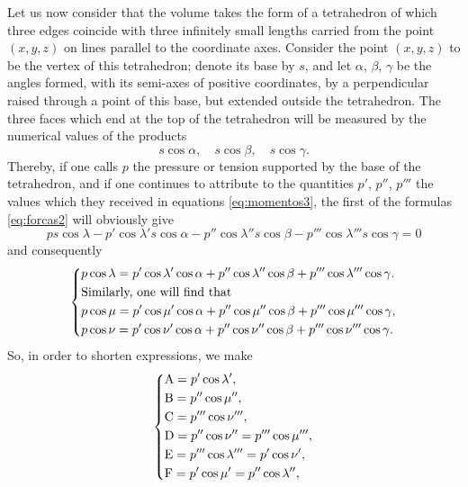 \documentclass[leqno,openright,smallroyalvopaper,8pt,twoside,showtrims]{memoir}
\begin{document}
Let us now consider that the volume takes the form of a tetrahedron of which three edges coincide with three infinitely small lengths carried from the point $(x, y, z)$ on lines parallel to the coordinate axes. Consider the point $(x, y, z)$ to be the vertex of this tetrahedron; denote its base by $s$, and let $\alpha$, $\beta$, $\gamma$ be the angles formed, with its semi-axes of positive coordinates, by a perpendicular raised through a point of this base, but extended outside the tetrahedron. The three faces which end at the top of the tetrahedron will be measured by the numerical values of the products
\begin{equation}
s\cos\alpha,\quad s\cos\beta,\quad s\cos\gamma.
\end{equation}
Thereby, if one calls $p$ the pressure or tension supported by the base of the tetrahedron, and if one continues to attribute to the quantities $p'$, $p''$, $p'''$ the values which they received in equations \eqref{eq:momentos3}, the first of the formulas \eqref{eq:forcas2} will obviously give
\begin{equation*}
ps\cos\lambda-p'\cos\lambda's\cos\alpha-p''\cos\lambda''s\cos\beta-p'''\cos\lambda'''s\cos\gamma = 0
\end{equation*}
and consequently
\begin{equation}
   \begin{dcases}
   p\cos\lambda = p'\cos\lambda'\cos\alpha+p''\cos\lambda''\cos\beta+p'''\cos\lambda'''\cos\gamma.\\
\text{Similarly, one will find that}\\
p\cos\mu = p'\cos\mu'\cos\alpha+p''\cos\mu''\cos\beta+p'''\cos\mu'''\cos\gamma,\\
p\cos\nu = p'\cos\nu'\cos\alpha+p''\cos\nu''\cos\beta+p'''\cos\nu'''\cos\gamma.
    \end{dcases}
 \end{equation}
 So, in order to shorten expressions, we make
 \begin{equation}
   \begin{dcases}
   \text{A} = p'\cos\lambda',\\
   \text{B} = p''\cos\mu'',\\
   \text{C} = p'''\cos\nu''',\\
    \text{D} = p''\cos\nu''=p'''\cos\mu''',\\  
    \text{E} = p'''\cos\lambda'''=p'\cos\nu',\\ 
    \text{F} = p'\cos\mu'=p''\cos\lambda'',\\ 
    \end{dcases}
 \end{equation}
\end{document}
